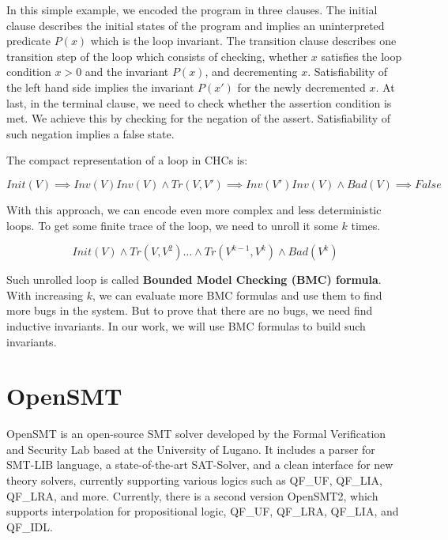 In this simple example, we encoded the program in three clauses. The initial
clause describes the initial states of the program and implies an uninterpreted
predicate $P(x)$ which is the loop invariant. The transition clause describes one
transition step of the loop which consists of checking, whether $x$ satisfies the
loop condition $x > 0$ and the invariant $P(x)$, and decrementing $x$. Satisfiability
of the left hand side implies the invariant $P(x')$ for the newly decremented $x$.
At last, in the terminal clause, we need to check whether the assertion
condition is met. We achieve this by checking for the negation of the assert.
Satisfiability of such negation implies a false state.

The compact representation of a loop in CHCs is:

\vspace{\baselineskip}
\begin{equation}
    Init(V) \implies Inv(V)
    Inv(V) \land Tr(V, V') \implies Inv(V')
    Inv(V) \land Bad(V) \implies False
\end{equation}

With this approach, we can encode even more complex and less deterministic loops. To get some finite trace of the loop, we need to unroll it some $k$ times.

\vspace{\baselineskip}
\begin{equation}
    Init(V) \land Tr(V, V^2) \dots \land Tr(V^{k-1}, V^k) \land Bad(V^k)
\end{equation}

Such unrolled loop is called \textbf{Bounded Model Checking (BMC) formula}. With increasing $k$, we can evaluate more BMC formulas and use them to find more bugs in the system. But to prove that there are no bugs, we need find inductive invariants. In our work, we will use BMC formulas to build such invariants.


\section{OpenSMT}
\noindent OpenSMT\cite{10.1007/978-3-642-12002-2_12} is an open-source SMT solver developed by the Formal Verification and Security Lab based at the University of Lugano. It includes a parser for SMT-LIB\cite{BarFT-SMTLIB} language, a state-of-the-art SAT-Solver, and a clean interface for new theory solvers, currently supporting various logics such as QF\_UF, QF\_LIA, QF\_LRA, and more. Currently, there is a second version OpenSMT2\cite{10.1007/978-3-319-40970-2_35}, which supports interpolation for propositional logic, QF\_UF, QF\_LRA, QF\_LIA, and QF\_IDL.



